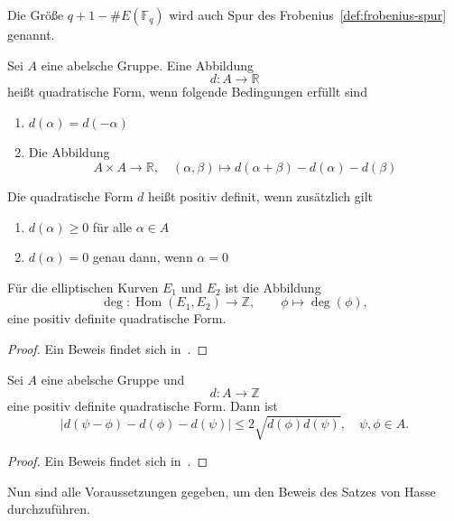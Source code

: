 Die Größe $q+1-\#E(\mathbb{F}_q)$ wird auch Spur des Frobenius~\ref{def:frobenius-spur} genannt.
\begin{definition}\label{def:quadratische-form}
    Sei $A$ eine abelsche Gruppe. Eine Abbildung
    \[
        d: A\to \mathbb{R}
    \]
    heißt quadratische Form, wenn folgende Bedingungen erfüllt sind
    \begin{enumerate}
        \item \(d(\alpha)=d(-\alpha)\)
        \item Die Abbildung
              \[
                  A\times A \to \mathbb{R}, \quad (\alpha,\beta)\mapsto d(\alpha+\beta)-d(\alpha)-d(\beta)
              \]
    \end{enumerate}
    Die quadratische Form $d$ heißt positiv definit, wenn zusätzlich gilt
    \begin{enumerate}
        \item $d(\alpha)\geq 0 $ für alle $\alpha\in A$
        \item $d(\alpha)=0$ genau dann, wenn $\alpha=0$
    \end{enumerate}
\end{definition}
\begin{corollary}\label{kor:gradabbildung}
    Für die elliptischen Kurven $E_1$ und $E_2$ ist die Abbildung
    \[
        \deg:\operatorname{Hom}(E_1,E_2)\to\mathbb{Z}, \qquad \phi\mapsto\deg(\phi),
    \]
    eine positiv definite quadratische Form.
\end{corollary}
\begin{proof}
    Ein Beweis findet sich in~\cite[Corollary III.6.3, S.~85]{silverman09}.
\end{proof}
\begin{lemma}\label{lem:cauchy-schwarz}
    Sei $A$ eine abelsche Gruppe und
    \[
        d:A\to \mathbb{Z}
    \]
    eine positiv definite quadratische Form. Dann ist
    \[
        \mid d(\psi-\phi)-d(\phi)-d(\psi)\mid\leq 2\sqrt{d(\phi)d(\psi)}, \quad \psi,\phi\in A.
    \]
\end{lemma}
\begin{proof}
    Ein Beweis findet sich in~\cite[Lemma V.1.2, S.~138]{silverman09}.
\end{proof}
Nun sind alle Voraussetzungen gegeben, um den Beweis des Satzes von Hasse durchzuführen.
